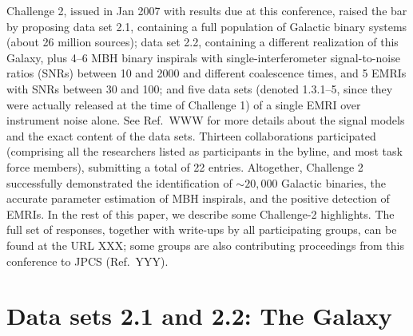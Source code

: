 \documentclass{iopart}
\begin{document}
Challenge 2, issued in Jan 2007 with results due at this conference, raised the bar by proposing data set 2.1, containing a full population of Galactic binary systems (about 26 million sources); data set 2.2, containing a different realization of this Galaxy, plus 4--6 MBH binary inspirals with single-interferometer signal-to-noise ratios (SNRs) between 10 and 2000 and different coalescence times, and 5 EMRIs with SNRs between 30 and 100; and five data sets (denoted 1.3.1--5, since they were actually released at the time of Challenge 1) of a single EMRI over instrument noise alone. See Ref.\ WWW for more details about the signal models and the exact content of the data sets. Thirteen collaborations participated (comprising all the researchers listed as participants in the byline, and most task force members), submitting a total of 22 entries. Altogether, Challenge 2 successfully demonstrated the identification of $\sim 20,000$ Galactic binaries, the accurate parameter estimation of MBH inspirals, and the positive detection of EMRIs. In the rest of this paper, we describe some Challenge-2 highlights. The full set of responses, together with write-ups by all participating groups, can be found at the URL XXX; some groups are also contributing proceedings from this conference to JPCS (Ref.\ YYY).

\section{Data sets 2.1 and 2.2: The Galaxy}
\end{document}
